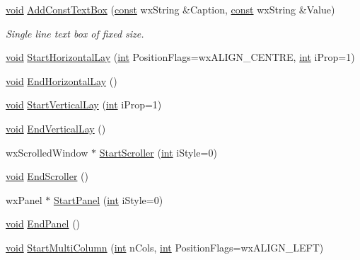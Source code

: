 \begin{DoxyCompactItemize}
\item 
\hyperlink{sound_8c_ae35f5844602719cf66324f4de2a658b3}{void} \hyperlink{class_shuttle_gui_base_a7c71cba69d98f41064d12f23df2b88dc}{Add\+Const\+Text\+Box} (\hyperlink{getopt1_8c_a2c212835823e3c54a8ab6d95c652660e}{const} wx\+String \&Caption, \hyperlink{getopt1_8c_a2c212835823e3c54a8ab6d95c652660e}{const} wx\+String \&Value)
\begin{DoxyCompactList}\small\item\em Single line text box of fixed size. \end{DoxyCompactList}\item 
\hyperlink{sound_8c_ae35f5844602719cf66324f4de2a658b3}{void} \hyperlink{class_shuttle_gui_base_aa456756283f789e26c6841eb3ca55c72}{Start\+Horizontal\+Lay} (\hyperlink{xmltok_8h_a5a0d4a5641ce434f1d23533f2b2e6653}{int} Position\+Flags=wx\+A\+L\+I\+G\+N\+\_\+\+C\+E\+N\+T\+RE, \hyperlink{xmltok_8h_a5a0d4a5641ce434f1d23533f2b2e6653}{int} i\+Prop=1)
\item 
\hyperlink{sound_8c_ae35f5844602719cf66324f4de2a658b3}{void} \hyperlink{class_shuttle_gui_base_a80917a37e36156f398a24436c1f3dba9}{End\+Horizontal\+Lay} ()
\item 
\hyperlink{sound_8c_ae35f5844602719cf66324f4de2a658b3}{void} \hyperlink{class_shuttle_gui_base_a6f8c4113388aa33dbb64204cd5ab1571}{Start\+Vertical\+Lay} (\hyperlink{xmltok_8h_a5a0d4a5641ce434f1d23533f2b2e6653}{int} i\+Prop=1)
\item 
\hyperlink{sound_8c_ae35f5844602719cf66324f4de2a658b3}{void} \hyperlink{class_shuttle_gui_base_a0286cb0ae146afcf8c589ceb16b37144}{End\+Vertical\+Lay} ()
\item 
wx\+Scrolled\+Window $\ast$ \hyperlink{class_shuttle_gui_base_a97aed7f1a02d6d19bd9eb6c016b31889}{Start\+Scroller} (\hyperlink{xmltok_8h_a5a0d4a5641ce434f1d23533f2b2e6653}{int} i\+Style=0)
\item 
\hyperlink{sound_8c_ae35f5844602719cf66324f4de2a658b3}{void} \hyperlink{class_shuttle_gui_base_add8025e59f86afce195ba648294e0cba}{End\+Scroller} ()
\item 
wx\+Panel $\ast$ \hyperlink{class_shuttle_gui_base_a2bd067fe917003cd7c646125e76ba538}{Start\+Panel} (\hyperlink{xmltok_8h_a5a0d4a5641ce434f1d23533f2b2e6653}{int} i\+Style=0)
\item 
\hyperlink{sound_8c_ae35f5844602719cf66324f4de2a658b3}{void} \hyperlink{class_shuttle_gui_base_ab8e903e339aede04b24d84f644be8d58}{End\+Panel} ()
\item 
\hyperlink{sound_8c_ae35f5844602719cf66324f4de2a658b3}{void} \hyperlink{class_shuttle_gui_base_ae71efe4837e02680f854a905b3b27120}{Start\+Multi\+Column} (\hyperlink{xmltok_8h_a5a0d4a5641ce434f1d23533f2b2e6653}{int} n\+Cols, \hyperlink{xmltok_8h_a5a0d4a5641ce434f1d23533f2b2e6653}{int} Position\+Flags=wx\+A\+L\+I\+G\+N\+\_\+\+L\+E\+FT)

\end{DoxyCompactItemize}
